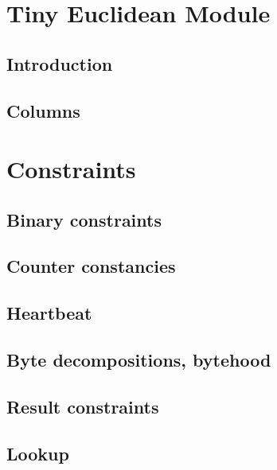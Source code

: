 

\section{Tiny Euclidean Module}
\subsection{Introduction}                                          \label{euc: intro}                    
\subsection{Columns}                                               \label{euc: columns}                  

\section{Constraints}
\subsection{Binary constraints}                                    \label{euc: binary}                   
\subsection{Counter constancies}                                   \label{euc: counter constancies}      
\subsection{Heartbeat}                                             \label{euc: heartbeat}                
\subsection{Byte decompositions, bytehood}                         \label{euc: byteDec and bytehood}     
\subsection{Result constraints}                                    \label{euc: result constraints}       
\subsection{Lookup}                                                \label{euc: lookup}                   
